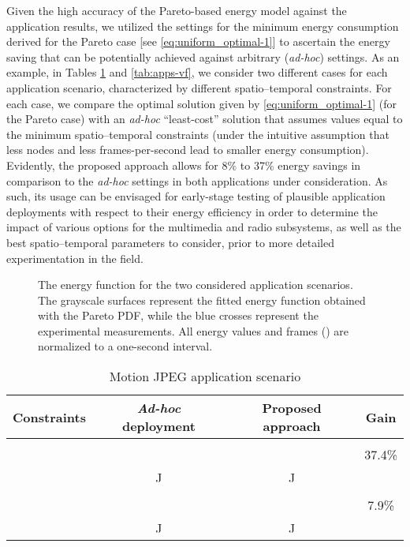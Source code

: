 \documentclass[twocolumn,english]{IEEEtran}
\providecommand{\tabularnewline}{\\}
\theoremstyle{plain}
\theoremstyle{definition}
\begin{document}
Given the high accuracy of the Pareto-based energy model against the
application results, we utilized the settings for the minimum energy
consumption derived for the Pareto case {[}see \eqref{eq:uniform_optimal-1}{]}
to ascertain the energy saving that can be potentially achieved against
arbitrary (\emph{ad-hoc}) settings. As an example, in Tables \ref{tab:apps-jpeg}
and \ref{tab:apps-vf}, we consider two different cases for each application
scenario, characterized by different spatio--temporal constraints.
For each case, we compare the optimal solution given by \eqref{eq:uniform_optimal-1}
(for the Pareto case) with an\emph{ ad-hoc} ``least-cost'' solution
that assumes values equal to the minimum spatio--temporal constraints
(under the intuitive assumption that less nodes and less frames-per-second
lead to smaller energy consumption). Evidently, the proposed approach
allows for 8\% to 37\% energy savings in comparison to the \emph{ad-hoc}
settings in both applications under consideration. As such, its usage
can be envisaged for early-stage testing of plausible application
deployments with respect to their energy efficiency in order to determine
the impact of various options for the multimedia and radio subsystems,
as well as the best spatio--temporal parameters to consider, prior
to more detailed experimentation in the field.

\begin{figure*}[t]
\centering{}  \caption{The energy function for the two considered application scenarios.
The grayscale surfaces represent the fitted energy function obtained
with the Pareto PDF, while the blue crosses represent the experimental
measurements. All energy values and frames () are normalized to
a one-second interval.}
\end{figure*}


\begin{table}
\caption{Motion JPEG application scenario \label{tab:apps-jpeg}}
\begin{tabular}{|c||c|c|c|}
\hline 
Constraints & \emph{Ad-hoc} deployment  & Proposed approach  & Gain \tabularnewline
\hline 
\hline 
 &   &   & \tabularnewline
  &   &   & 37.4\% \tabularnewline
  &  J  &  J  & \tabularnewline
\hline 
\hline 
 &   &   & \tabularnewline
  &   &   & 7.9\%\tabularnewline
  &  J  &  J  & \tabularnewline
\hline 
\end{tabular}
\end{table}
\end{document}
